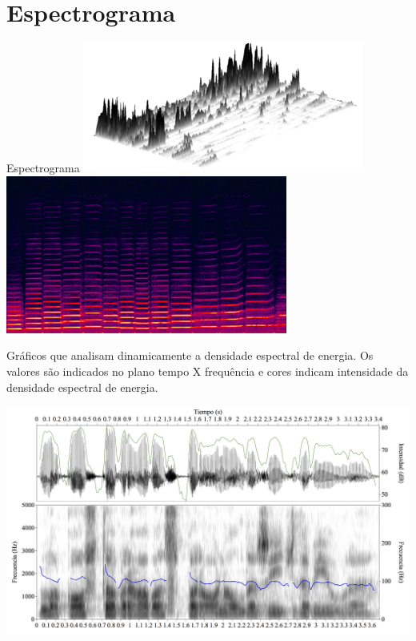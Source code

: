 \documentclass[10pt, compress]{beamer}
\begin{document}
\section{Espectrograma} %
\begin{frame}{Espectrograma}
\centering
\includegraphics[scale=0.4]{images/spect1.png}
\includegraphics[scale=0.4]{images/spect2.png}
\\
\begin{center} Gráficos que analisam dinamicamente a densidade espectral de energia. Os valores são indicados no plano \alert{tempo} X \alert{frequência} e cores indicam \alert{intensidade} da densidade espectral de energia. \end{center}
\end{frame}

\begin{frame}
\centering
\includegraphics[scale=0.1]{images/spect3.jpg}
\end{frame}
\end{document}

